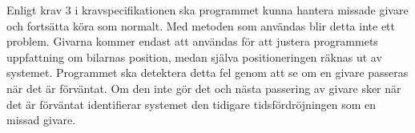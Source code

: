 Enligt krav 3 i kravspecifikationen ska programmet kunna hantera missade givare
och fortsätta köra som normalt. Med metoden som användas blir detta inte ett
problem.  Givarna kommer endast att användas för att justera programmets
uppfattning om bilarnas position, medan själva positioneringen räknas ut av
systemet. Programmet ska detektera detta fel genom att se om en givare passeras
när det är förväntat. Om den inte gör det och nästa passering av givare sker när
det är förväntat identifierar systemet den tidigare tidsfördröjningen som en
missad givare.
